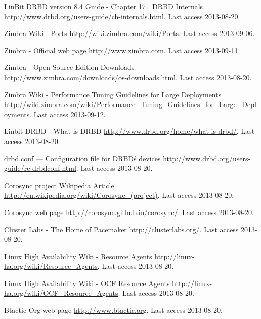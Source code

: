 \begin{thebibliography}{1}
 LinBit DRBD version 8.4 Guide - Chapter 17 . DRBD Internals
\url{http://www.drbd.org/users-guide/ch-internals.html}. Last access 2013-08-20.


 Zimbra Wiki - Ports
\url{http://wiki.zimbra.com/wiki/Ports}. Last access 2013-09-06.


 Zimbra - Official web page
\url{http://www.zimbra.com}. Last access 2013-09-11.

 Zimbra - Open Source Edition Downloads
\url{http://www.zimbra.com/downloads/os-downloads.html}. Last access 2013-08-20.

 Zimbra Wiki - Performance Tuning Guidelines for Large Deployments
\url{http://wiki.zimbra.com/wiki/Performance_Tuning_Guidelines_for_Large_Deployments}. Last access 2013-09-12.


 Linbit DRBD - What is DRBD
\url{http://www.drbd.org/home/what-is-drbd/}. Last access 2013-08-20.

 drbd.conf — Configuration file for DRBD\'s devices
\url{http://www.drbd.org/users-guide/re-drbdconf.html}. Last access 2013-08-20.


 Corosync project Wikipedia Article
\url{http://en.wikipedia.org/wiki/Corosync_(project)}. Last access 2013-08-20.

 Corosync web page
\url{http://corosync.github.io/corosync/}. Last access 2013-08-20.

 Cluster Labs - The Home of Pacemaker
\url{http://clusterlabs.org/}. Last access 2013-08-20.


 Linux High Availability Wiki - Resource Agents
\url{http://linux-ha.org/wiki/Resource_Agents}. Last access 2013-08-20.

 Linux High Availability Wiki - OCF Resource Agents
\url{http://linux-ha.org/wiki/OCF_Resource_Agents}. Last access 2013-08-20.

 Btactic Org web page
\url{http://www.btactic.org}. Last access 2013-08-20.


\end{thebibliography}
